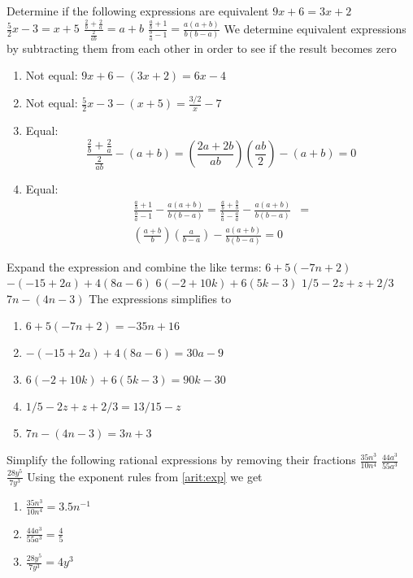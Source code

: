 \begin{ExerciseList}
\Exercise Determine if the following expressions are equivalent
\Question $9x+6 = 3x+2$
\Question $\frac{5}{2}x - 3 = x+5$
\Question $\frac{\frac{2}{b} + \frac{2}{a}}{\frac{2}{ab}} = a+b$
\Question $\frac{\frac{a}{b} + 1}{\frac{b}{a} - 1} = \frac{a(a+b)}{b(b-a)}$
\Answer We determine equivalent expressions by subtracting them from each other in order to see if the result becomes zero
\begin{enumerate}
\item \myindent Not equal: $9x + 6 - (3x+2) = 6x - 4$
\item \myindent Not equal: $\frac{5}{2}x - 3 - (x + 5) = \frac{3/2}x - 7$
\item \myindent Equal:
\[
\frac{\frac{2}{b} + \frac{2}{a}}{\frac{2}{ab}} - (a + b) =
\left(\frac{2a + 2b}{ab}\right)\left(\frac{ab}{2}\right) - (a + b) = 0
\]
\item \myindent Equal:
\begin{align*}
\frac{\frac{a}{b}+1}{\frac{b}{a}-1} - \frac{a(a+b)}{b(b-a)} =
\frac{\frac{a}{b} + \frac{b}{b}}{\frac{b}{a} - \frac{a}{a}} - \frac{a(a+b)}{b(b-a)} &= \\
\left(\frac{a + b}{b}\right)\left(\frac{a}{b-a}\right) - \frac{a(a+b)}{b(b-a)} = 0
\end{align*}
\end{enumerate}

\Exercise Expand the expression and combine the like terms:
\Question $6+5(−7n+2)$
\Question $−(−15+2a)+4(8a−6)$
\Question $6(−2+10k)+6(5k−3)$
\Question $1/5 - 2z + z + 2/3$
\Question $7n - (4n - 3)$
\Answer The expressions simplifies to
\begin{enumerate}
\item \myindent $6+5(-7n+2) = -35n + 16$
\item \myindent $-(-15+2a)+4(8a-6) = 30a - 9$
\item \myindent $6(-2+10k)+6(5k-3) = 90k - 30$
\item \myindent $1/5 - 2z + z + 2/3 = 13/15 - z$
\item \myindent $7n - (4n - 3) = 3n + 3$
\end{enumerate}

\Exercise Simplify the following rational expressions by removing their fractions
\Question $\frac{35n^3}{10n^4}$
\Question $\frac{44a^3}{55a^3}$
\Question $\frac{28y^5}{7y^3}$
\Answer Using the exponent rules from \ref{arit:exp} we get
\begin{enumerate}
\item \myindent $\frac{35n^3}{10n^4} = 3.5n^{-1}$
\item \myindent $\frac{44a^3}{55a^3} = \frac{4}{5}$
\item \myindent $\frac{28y^5}{7y^3} = 4y^3$
\end{enumerate}


\end{ExerciseList}
